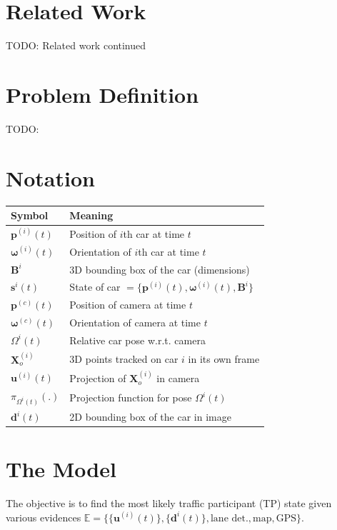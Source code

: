 \documentclass[10pt,twocolumn,letterpaper]{article}
\newcommand{\pos}[2]{\mathbf{p}^{(#1)}(#2)}
\newcommand{\ori}[2]{\mathbf{\omega}^{(#1)}(#2)}
\newcommand{\state}[2]{\mathbf{s}^{#1}(#2)}
\newcommand{\egop}[1][t]{\pos{c}{#1}}
\newcommand{\egoo}[1][t]{\ori{c}{#1}}
\newcommand{\relp}[2]{\Omega^{#1}(#2)}
\newcommand{\tracklets}{\mathbf{X}^{(i)}_o}
\newcommand{\trackp}[1]{\mathbf{u}^{(i)}(#1)}
\newcommand{\dimsn}[1]{\mathbf{B}^{#1}}
\newcommand{\projectionOf}[1]{\pi_{\relp{i}{t}}\left(#1\right)}
\newcommand{\bb}[1]{\mathbf{d}^{#1}(t)}
\begin{document}
\section{Related Work}
TODO:
\vfill
\pagebreak
Related work continued
\vspace{15cm}

\section{Problem Definition}
TODO:
\vspace{4cm}


\section{Notation}


\begin{table}[h]
  \begin{tabular}{|l|l|}
    \hline
    Symbol & Meaning \\
    \hline
    $\pos{i}{t}$ & Position of $i$th car at time $t$\\
    $\ori{i}{t}$ & Orientation of $i$th car at time $t$\\
     $\dimsn{i}$ & 3D bounding box of the car (dimensions)\\
    $\state{i}{t}$ & State of car $=\{\pos{i}{t}, \ori{i}{t}, \dimsn{i}\}$\\
    $\egop$ & Position of camera at time $t$\\
    $\egoo$ & Orientation of camera at time $t$\\
    $\relp{i}{t}$ & Relative car pose w.r.t. camera \\
    $\tracklets$ & 3D points tracked on car $i$ in its own frame\\
    $\trackp{t}$ & Projection of $\tracklets$ in camera\\
    $\projectionOf{.}$ & Projection function for pose $\relp{i}{t}$\\
    $\bb{i}$ & 2D bounding box of the car in image\\
    \hline
  \end{tabular}
\end{table}

\section{The Model}

The objective is to find the most likely traffic participant (TP) state given
various evidences $\mathbb{E} = \{\{\trackp{t}\}, \{\bb{i}\}, \text{lane det.},
\text{map}, \text{GPS}\}$.
\end{document}
